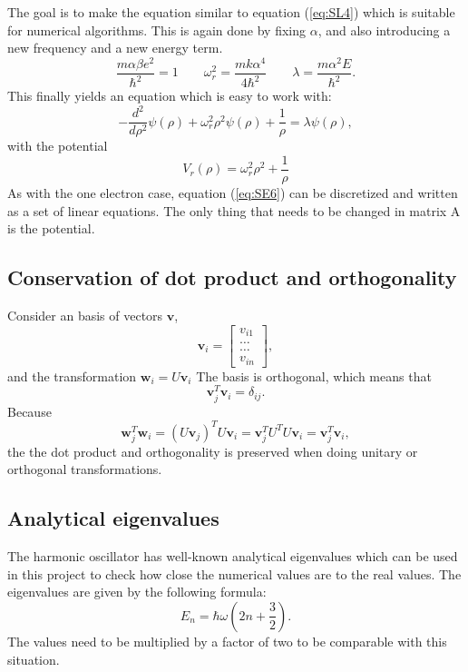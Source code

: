 \documentclass[10pt,a4paper,titlepage]{article}
\begin{document}
The goal is to make the equation similar to equation (\ref{eq:SL4}) which is suitable for numerical algorithms. This is again done by fixing $\alpha$, and also introducing a new frequency and a new energy term. 
\begin{equation*}
\frac{m\alpha \beta e^2}{\hbar^2}=1 \qquad  \omega_r^2 = \frac{mk\alpha^4}{4\hbar^2} \qquad \lambda = \frac{m\alpha^2E}{\hbar^2}.
\end{equation*}
This finally yields an equation which is easy to work with:
\begin{equation}
\label{eq:SE6}
-\frac{d^{2}}{d\rho^{2}} \psi(\rho) + \omega_r^{2}\rho^{2}\psi(\rho) +\frac{1}{\rho} = \lambda \psi(\rho),
\end{equation}
with the potential
\begin{equation}
V_r(\rho) = \omega_r^2\rho^2 + \frac{1}{\rho}
\end{equation}
As with the one electron case, equation (\ref{eq:SE6}) can be discretized and written as a set of linear equations. The only thing that needs to be changed in matrix A is the potential. 

\subsection{Conservation of dot product and orthogonality}
Consider an basis of vectors $\mathbf{v}$,
\[
\mathbf{v}_i = \begin{bmatrix} v_{i1} \\ \dots \\ \dots \\v_{in} \end{bmatrix},
\]
and the transformation $\mathbf{w}_{i}=U\mathbf{v}_{i}$
The basis is orthogonal, which means that
\begin{equation*}
\mathbf{v}_{j}^{T}\mathbf{v}_{i} = \delta_{ij}.
\end{equation*}
Because
\begin{equation*}
\mathbf{w}_{j}^{T} \mathbf{w}_{i} = (U\mathbf{v}_{j})^{T}U\mathbf{v}_{i} = \mathbf{v}_{j}^{T}U^{T}U\mathbf{v}_{i} = \mathbf{v}_{j}^{T}\mathbf{v}_{i},
\end{equation*}
the the dot product and orthogonality is preserved when doing unitary or orthogonal transformations.

\subsection{Analytical eigenvalues}
The harmonic oscillator has well-known analytical eigenvalues which can be used in this project to check how close the numerical values are to the real values. The eigenvalues are given by the following formula:
\begin{equation}
E_{n} = \hbar\omega(2n+\frac{3}{2}). 
\end{equation}
The values need to be multiplied by a factor of two to be comparable with this situation. 
\end{document}
